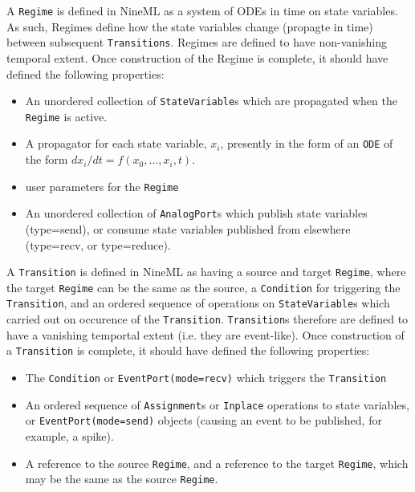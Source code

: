 \documentclass[a4paper]{article}
\newcommand\nmlClass[1]{{\tt #1}}
\begin{document}

A \nmlClass{Regime} is defined in NineML as a system of ODEs in time on
state variables.  As such, Regimes define how the state variables
change (propagte in time) between subsequent \nmlClass{Transitions}.
Regimes are defined to have non-vanishing temporal extent.  Once
construction of the Regime is complete, it should have defined the
following properties:
\begin{itemize}
\item An unordered collection of \nmlClass{StateVariable}s which are propagated when the \nmlClass{Regime} is active.
\item A propagator for each state variable, $x_i$, presently in the
  form of an \nmlClass{ODE} of the form $dx_i/dt = f(x_0, ..., x_i, t)$.
\item user parameters for the \nmlClass{Regime}
\item An unordered collection of \nmlClass{AnalogPort}s which publish state variables (type=send),
  or consume state variables published from elsewhere (type=recv, or type=reduce).
\end{itemize}

A \nmlClass{Transition} is defined in NineML as having a source and target
\nmlClass{Regime}, where the target \nmlClass{Regime} can be the same as the source, a
\nmlClass{Condition} for triggering the \nmlClass{Transition}, and an ordered sequence of
operations on \nmlClass{StateVariable}s which carried out on occurence of the
\nmlClass{Transition}.  \nmlClass{Transition}s therefore are defined to have a vanishing
temportal extent (i.e. they are event-like).  Once construction of a
\nmlClass{Transition} is complete, it should have defined the following properties:
\begin{itemize}
\item The \nmlClass{Condition} or \nmlClass{EventPort(mode=recv)} which triggers the \nmlClass{Transition}
\item An ordered sequence of \nmlClass{Assignment}s or
  \nmlClass{Inplace} operations to state variables, or
  \nmlClass{EventPort(mode=send)} objects (causing an event to be published, for example, a spike).
\item A reference to the source \nmlClass{Regime}, and a reference to the target
  \nmlClass{Regime}, which may be the same as the source \nmlClass{Regime}.
\end{itemize}
\end{document}
